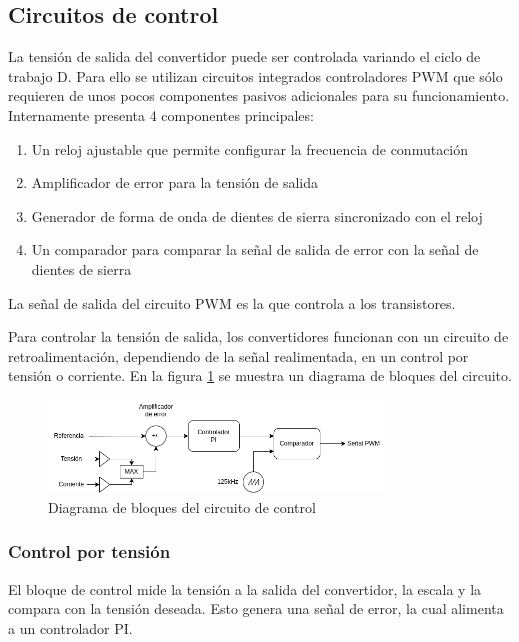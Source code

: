 \subsection{Circuitos de control}

La tensión de salida del convertidor puede ser controlada variando el ciclo de trabajo D. 
Para ello se utilizan circuitos integrados controladores PWM que sólo requieren de unos pocos componentes pasivos adicionales para su funcionamiento. 
Internamente presenta 4 componentes principales:
\begin{enumerate}
    \item Un reloj ajustable que permite configurar la frecuencia de conmutación
    \item Amplificador de error para la tensión de salida
    \item Generador de forma de onda de dientes de sierra sincronizado con el reloj
    \item Un comparador para comparar la señal de salida de error con la señal de dientes de sierra
\end{enumerate}

La señal de salida del circuito PWM es la que controla a los transistores. 

Para controlar la tensión de salida, los convertidores funcionan con un circuito de retroalimentación,
dependiendo de la señal realimentada, en un control por tensión o corriente. En la figura \ref{fig:marco_teorico:control} se muestra un diagrama de bloques del circuito.

\begin{figure}[ht]
    \centering
    \includegraphics[width=0.8\textwidth]{images/compensador.png}
    \caption{Diagrama de bloques del circuito de control}
    \label{fig:marco_teorico:control}
\end{figure}

\subsubsection{Control por tensión}

El bloque de control mide la tensión a la salida del convertidor, la escala y la compara con la tensión deseada.
Esto genera una señal de error, la cual alimenta a un controlador PI.

